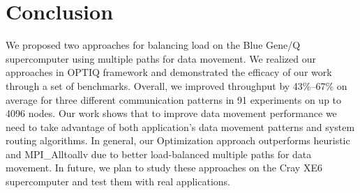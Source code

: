 \section{Conclusion}
\label{sec:conclusion}
We proposed two approaches for balancing load on the Blue Gene/Q supercomputer using multiple paths for data movement. We realized our approaches in OPTIQ framework and demonstrated the efficacy of our work through a set of benchmarks. Overall, we improved throughput by 43\%--67\% on average for three different communication patterns in 91 experiments on up to 4096 nodes. %
Our work shows that to improve data movement performance we need to take advantage of both application's data movement patterns and system routing algorithms. In general, our Optimization approach outperforms heuristic and MPI\_Alltoallv due to better load-balanced multiple paths for data movement. In future, we plan to study these approaches on the Cray XE6 supercomputer and test them with real applications.
